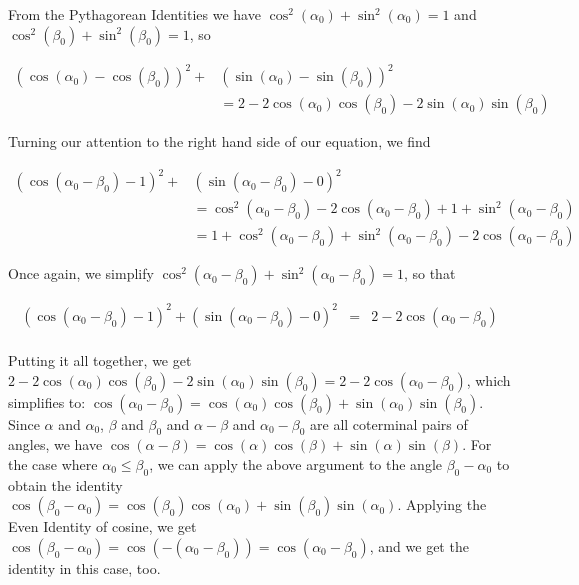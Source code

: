 From the Pythagorean Identities we have  $\cos^2(\alpha_{0}) + \sin^2(\alpha_{0}) = 1$ and $\cos^2(\beta_{0}) + \sin^2(\beta_{0}) = 1$, so

\begin{align*}
(\cos(\alpha_{0}) - \cos(\beta_{0}))^2 +& (\sin(\alpha_{0}) - \sin(\beta_{0}))^2 \\
& = 2  - 2\cos(\alpha_{0})\cos(\beta_{0}) - 2\sin(\alpha_{0})\sin(\beta_{0})
\end{align*}

Turning our attention to the right hand side of our equation, we find

\begin{align*}
(\cos(\alpha_{0} - \beta_{0}) - 1)^2 + & (\sin(\alpha_{0} - \beta_{0}) - 0)^2 \\
& =  \cos^2(\alpha_{0} - \beta_{0}) - 2\cos(\alpha_{0} - \beta_{0}) + 1 + \sin^2(\alpha_{0} - \beta_{0}) \\ 
& =  1 +  \cos^2(\alpha_{0} - \beta_{0}) + \sin^2(\alpha_{0} - \beta_{0}) - 2\cos(\alpha_{0} - \beta_{0}) 
\end{align*}

Once again, we simplify $\cos^2(\alpha_{0} - \beta_{0}) + \sin^2(\alpha_{0} - \beta_{0})= 1$, so that

\[ \begin{array}{rcl}
(\cos(\alpha_{0} - \beta_{0}) - 1)^2 + (\sin(\alpha_{0} - \beta_{0}) - 0)^2 & = & 2  - 2\cos(\alpha_{0} - \beta_{0}) \\ \end{array} \]

Putting it all together, we get $2  - 2\cos(\alpha_{0})\cos(\beta_{0}) - 2\sin(\alpha_{0})\sin(\beta_{0}) = 2  - 2\cos(\alpha_{0} - \beta_{0})$, which simplifies to: $\cos(\alpha_{0} - \beta_{0}) = \cos(\alpha_{0})\cos(\beta_{0}) + \sin(\alpha_{0})\sin(\beta_{0})$.  Since $\alpha$ and $\alpha_{0}$, $\beta$ and $\beta_{0}$ and $\alpha - \beta$ and $\alpha_{0}- \beta_{0}$ are all coterminal pairs of angles, we have $\cos(\alpha - \beta) = \cos(\alpha) \cos(\beta) + \sin(\alpha) \sin(\beta)$.  For the case where $\alpha_{0} \leq \beta_{0}$, we can apply the above argument to the angle $\beta_{0} - \alpha_{0}$ to obtain the identity  $\cos(\beta_{0} - \alpha_{0}) = \cos(\beta_{0})\cos(\alpha_{0}) + \sin(\beta_{0})\sin(\alpha_{0})$.  Applying the Even Identity of cosine, we get $\cos(\beta_{0} - \alpha_{0}) = \cos( - (\alpha_{0} - \beta_{0})) = \cos(\alpha_{0} - \beta_{0})$, and we get the identity in this case, too.   

\medskip

